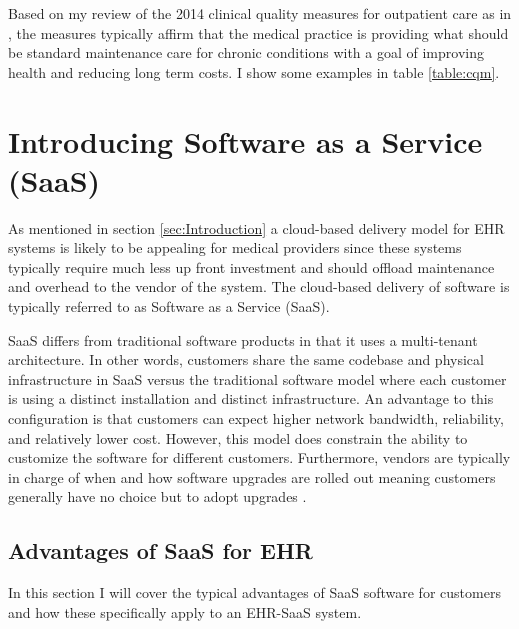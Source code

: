 \documentclass[10pt]{article}
\begin{document}
Based on my review of the 2014 clinical quality measures for outpatient care as in \cite{cqm-pdf}, the measures typically affirm that the medical practice is providing what should be standard maintenance care for chronic conditions with a goal of improving health and reducing long term costs. I show some examples in table \ref{table:cqm}.



\section{Introducing Software as a Service (SaaS)}
\label{sec:Intro_SaaS}

As mentioned in section \ref{sec:Introduction} a cloud-based delivery model for EHR systems is likely to be appealing for medical providers since these systems typically require much less up front investment and should offload maintenance and overhead to the vendor of the system.
The cloud-based delivery of software is typically referred to as Software as a Service (SaaS).

SaaS differs from traditional software products in that it uses a multi-tenant architecture.
In other words, customers share the same codebase and physical infrastructure in SaaS versus the traditional software model where each customer is using a distinct installation and distinct infrastructure.
An advantage to this configuration is that customers can expect higher network bandwidth, reliability, and relatively lower cost.
However, this model does constrain the ability to customize the software for different customers.
Furthermore, vendors are typically in charge of when and how software upgrades are rolled out meaning customers generally have no choice but to adopt upgrades \cite{saasqual}.

\subsection{Advantages of SaaS for EHR}
\label{sec:SaaS Adantages}

In this section I will cover the typical advantages of SaaS software for customers and how these specifically apply to an EHR-SaaS system.
\end{document}
